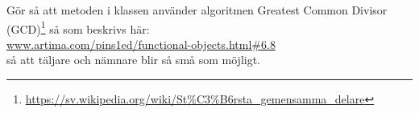 \Subtask Gör så att metoden  i klassen  använder algoritmen Greatest Common Divisor (GCD)\footnote{\href{https://sv.wikipedia.org/wiki/St\%C3\%B6rsta_gemensamma_delare}{https://sv.wikipedia.org/wiki/St\%C3\%B6rsta\_gemensamma\_delare}} så som beskrivs här: \\ \href{http://www.artima.com/pins1ed/functional-objects.html#6.8}{www.artima.com/pins1ed/functional-objects.html\#6.8} \\ så att täljare och nämnare blir så små som möjligt.

\clearpage

\SOLUTION


\QUESTEND
